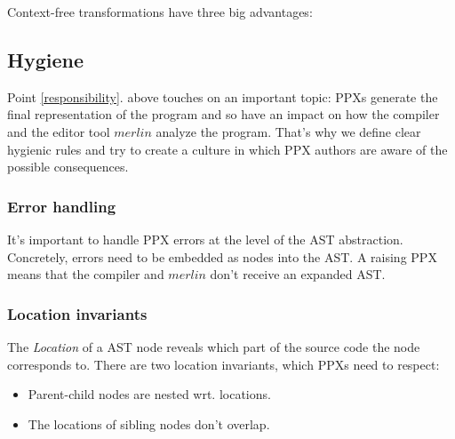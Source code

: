 \documentclass[10pt, a4paper, twocolumn]{article}
\begin{document}
\vspace{25pt}

Context-free transformations have three big advantages:

\subsection{Hygiene}

Point \ref{responsibility}. above touches on an important topic: PPXs generate
the final representation of the program and so have an impact on how the
compiler and the editor tool $merlin$ analyze the program. That's why we define
clear hygienic rules\cite{hygiene} and try to create a culture in which PPX
authors are aware of the possible consequences.

\subsubsection*{Error handling}

It's important to handle PPX errors at the level of the AST abstraction.
Concretely, errors need to be embedded as nodes into the AST. A raising PPX
means that the compiler and $merlin$ don't receive an expanded AST.

\subsubsection*{Location invariants}

The \emph{Location} of a AST node reveals which part of the source code the node
corresponds to.
There are two location invariants, which PPXs need to respect:
\begin{itemize}
\item Parent-child nodes are nested wrt. locations.
\item The locations of sibling nodes don't overlap.
\end{itemize}
\end{document}
